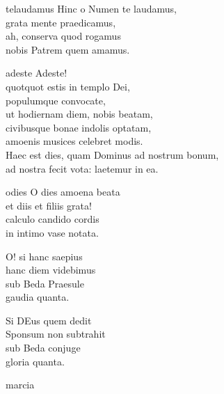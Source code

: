 \documentclass[tocstyle=ref-genre]{ees}
\begin{document}
{\begin{movement}{telaudamus}
  \voice[Coro]
  Hinc o Numen te laudamus,\\
  grata mente praedicamus,\\
  ah, conserva quod rogamus\\
  nobis Patrem quem amamus.
\end{movement}

\begin{movement}{adeste}
  Adeste!\\
  quotquot estis in templo Dei,\\
  populumque convocate,\\
  ut hodiernam diem, nobis beatam,\\
  civibusque bonae indolis optatam,\\
  amoenis musices celebret modis.\\
  Haec est dies, quam Dominus ad nostrum bonum,\\
  ad nostra fecit vota: laetemur in ea.
\end{movement}

\begin{movement}{odies}
  \voice[Chorus]
  O dies amoena beata\\
  et diis et filiis grata!\\
  calculo candido cordis\\
  in intimo vase notata.

  O! si hanc saepius\\
  hanc diem videbimus\\
  sub Beda Praesule\\
  gaudia quanta.

  Si DEus quem dedit\\
  Sponsum non subtrahit\\
  sub Beda conjuge\\
  gloria quanta.
\end{movement}

\begin{movement}{marcia}
  \voice[]
\end{movement}
}

\eesScore
\end{document}
